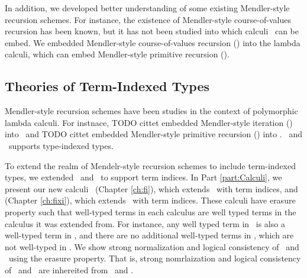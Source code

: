 In addition, we developed better understanding of some existing Mendler-style
recursion schemes. For instance, the existence of Mendler-style course-of-values
recursion has been known, but it has not been studied into which calculi
\McvPr\ can be embed. We embedded Mendler-style course-of-values recursion
(\McvPr) into the lambda calculi, which can embed Mendler-style primitive
recursion (\MPr).


\subsection{Theories of Term-Indexed Types}
Mendler-style recursion schemes have been studies in the context of
polymorphic lambda calculi. For instnace, {TODO cittet} embedded 
Mendler-style iteration (\MIt) into \Fw\ and {TODO cittet} embedded
Mendler-style primitive recursion (\MPr) into \Fixw.
\Fw\ and \Fixw\ supports type-indexed types.

To extend the realm of Mendelr-style recursion schemes to include
term-indexed types, we extended \Fw\ and \Fixw\ to support term indices.
In Part \ref{part:Calculi}, we present our new calculi
\Fi\ (Chapter \ref{ch:fi}), which extends \Fw\ with term indices, and
\Fixi (Chapter \ref{ch:fixi}), which extends \Fixw\ with term indices.
These calculi have erasure property such that well-typed terms
in each calculus are well typed terms in the calculus it was
extended from. For instance, any well typed term in \Fi\ is also
a well-typed term in \Fw, and there are no additional well-typed terms
in \Fi, which are not well-typed in \Fw.
We show strong normalization and logical consistency of \Fi\ and \Fixi\ using
the erasure property. That is, strong nomrlaization and logical consistency
of \Fi\ and \Fixi\ are inhereited from \Fw\ and \Fixw.

